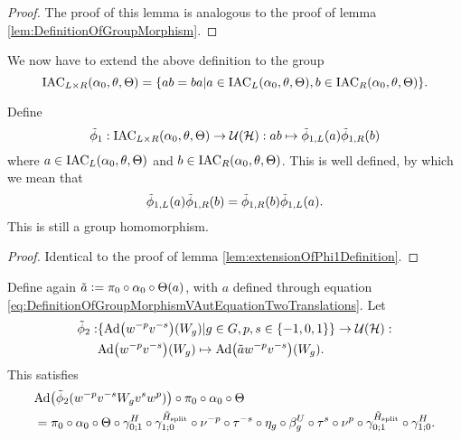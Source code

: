\documentclass[11pt,a4paper,twoside]{article}
\numberwithin{equation}{section}
\begin{document}
\begin{proof}
	The proof of this lemma is analogous to the proof of lemma \ref{lem:DefinitionOfGroupMorphism}.
\end{proof}
We now have to extend the above definition to the group
\begin{equation}
	\textrm{IAC}_{L\times R}(\alpha_0,\theta,\Theta)=\{ab=ba|a\in\textrm{IAC}_{L}(\alpha_0,\theta,\Theta),b\in\textrm{IAC}_{R}(\alpha_0,\theta,\Theta)\}.
\end{equation}
\begin{lemma}\label{lem:PropertyTilde_aTwoTranslationsLeftAndRight}
	Define
	\begin{equation}
		\tilde{\phi}_1:\textrm{IAC}_{L\times R}(\alpha_0,\theta,\Theta)\rightarrow\mathcal U(\mathcal H):ab\mapsto \tilde{\phi}_{1,L}(a)\tilde{\phi}_{1,R}(b)
	\end{equation}
	where $a\in \textrm{IAC}_{L}(\alpha_0,\theta,\Theta)$ and $b\in \textrm{IAC}_{R}(\alpha_0,\theta,\Theta)$. This is well defined, by which we mean that
	\begin{equation}
		\tilde{\phi}_{1,L}(a)\tilde{\phi}_{1,R}(b)=\tilde{\phi}_{1,R}(b)\tilde{\phi}_{1,L}(a).
	\end{equation}
	This is still a group homomorphism.
\end{lemma}
\begin{proof}
	Identical to the proof of lemma \ref{lem:extensionOfPhi1Definition}.
\end{proof}
\begin{lemma}\label{lem:DefinitionOfWgMapTwoTranslations}
	Define again $\tilde{a}\vcentcolon= \pi_0\circ\alpha_0\circ\Theta(a)$, with $a$ defined through equation \eqref{eq:DefinitionOfGroupMorphismVAutEquationTwoTranslations}. Let
	\begin{align}
		\phiTilde_2:&\{\Ad{w^{-p}v^{-s}}(W_g)|g\in G,p,s\in\{-1,0,1\}\}\rightarrow \UU(\HH):\\
		\nonumber
		&\Ad{w^{-p}v^{-s}}(W_g) \mapsto \Ad{\tilde{a} w^{-p}v^{-s}}(W_g).
	\end{align}
	This satisfies
	\begin{align}\label{eq:lemDefinitionOfWgMapConditionTwoTranslations}
		&\Ad{\phiTilde_2(w^{-p}v^{-s}W_g v^{s} w^p)}\circ\pi_0\circ\alpha_0\circ\Theta\\
		\nonumber
		&=\pi_0\circ \alpha_0\circ\Theta\circ\gamma^{H}_{0;1}\circ\gamma^{\HsplitTilde}_{1;0}\circ\nu^{-p}\circ\tau^{-s}\circ\eta_g\circ\beta_g^U\circ\tau^s\circ\nu^p\circ\gamma^{\HsplitTilde}_{0;1}\circ\gamma^{H}_{1;0}.
	\end{align}
\end{lemma}
\end{document}
